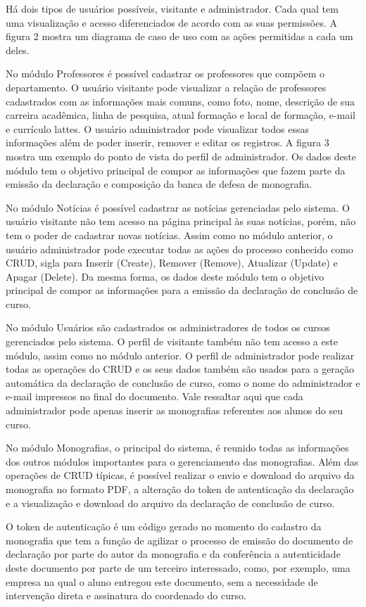 \documentclass[
	12pt,				%
	openright,			%
	twoside,			%
	a4paper,			%
	english,			%
	french,				%
	spanish,			%
	brazil,				%
	]{abntex2}
\begin{document}
Há dois tipos de usuários possíveis, visitante e administrador. Cada qual tem uma visualização e acesso diferenciados de acordo com as suas permissões. A figura 2 mostra um diagrama de caso de uso com as ações permitidas a cada um deles.

No módulo Professores é possível cadastrar os professores que compõem o departamento. O usuário visitante pode visualizar a relação de professores cadastrados com as informações mais comuns, como foto, nome, descrição de sua carreira acadêmica, linha de pesquisa, atual formação e local de formação, e-mail e currículo lattes. O usuário administrador pode visualizar todos essas informações além de poder inserir, remover e editar os registros. A figura 3 mostra um exemplo do ponto de vista do perfil de administrador. Os dados deste módulo tem o objetivo principal de compor as informações que fazem parte da emissão da declaração e composição da banca de defesa de monografia.

No módulo Notícias é possível cadastrar as notícias gerenciadas pelo sistema. O usuário visitante não tem acesso na página principal às suas notícias, porém, não tem o poder de cadastrar novas notícias. Assim como no módulo anterior, o usuário administrador pode executar todas as ações do processo conhecido como CRUD, sigla para Inserir (Create), Remover (Remove), Atualizar (Update) e Apagar (Delete). Da mesma forma, os dados deste módulo tem o objetivo principal de compor as informações para a emissão da declaração de conclusão de curso.

No módulo Usuários são cadastrados os administradores de todos os cursos gerenciados pelo sistema. O perfil de visitante também não tem acesso a este módulo, assim como no módulo anterior. O perfil de administrador pode realizar todas as operações do CRUD e os seus dados também são usados para a geração automática da declaração de conclusão de curso, como o nome do administrador e e-mail impressos no final do documento. Vale ressaltar aqui que cada administrador pode apenas inserir as monografias referentes aos alunos do seu curso.

No módulo Monografias, o principal do sistema, é reunido todas as informações dos outros módulos importantes para o gerenciamento das monografias. Além das operações de CRUD típicas, é possível realizar o envio e download do arquivo da monografia no formato PDF, a alteração do token de autenticação da declaração e a visualização e download do arquivo da declaração de conclusão de curso.

O token de autenticação é um código gerado no momento do cadastro da monografia que tem a função de agilizar o processo de emissão do documento de declaração por parte do autor da monografia e da conferência a autenticidade deste documento por parte de um terceiro interessado, como, por exemplo, uma empresa na qual o aluno entregou este documento, sem a necessidade de intervenção direta e assinatura do coordenado do curso.
\end{document}
